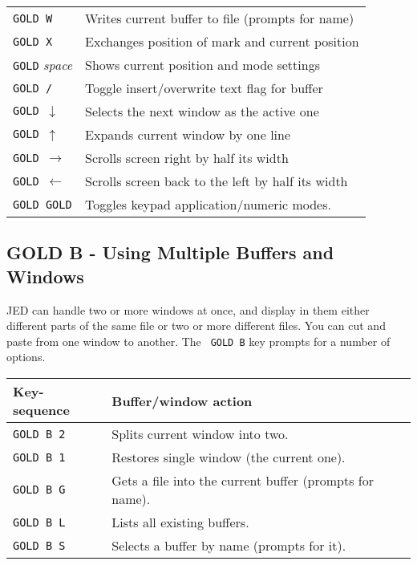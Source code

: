 \documentclass[twoside,11pt]{article}
\newcommand{\xlabel}[1]{}
\begin{document}
\begin{center}
\begin{tabular}{|ll|}
\texttt{GOLD W} & Writes current buffer to file (prompts for name) \\
\texttt{GOLD X} & Exchanges position of mark and current position \\
\texttt{GOLD} \textit{space}   & Shows current position and mode settings \\
\texttt{GOLD /} & Toggle insert/overwrite text flag for buffer \\
\texttt{GOLD $\downarrow$}  & Selects the next window as the active one\\
\texttt{GOLD $\uparrow$  }  & Expands current window by one line \\
\texttt{GOLD $\rightarrow$} & Scrolls screen right by half its width \\
\texttt{GOLD $\leftarrow$ } & Scrolls screen back to the left by half its width \\
\texttt{GOLD GOLD}          & Toggles keypad application/numeric modes.\\
\hline
\end{tabular}
\end{center}


\subsection{\xlabel{gold_b_-_using_multiple_buffers_and_windows}%
GOLD B - Using Multiple Buffers and Windows}
\label{gold_b_-_using_multiple_buffers_and_windows}
\label{buff-ops}

JED can handle two or more windows at once, and display in them either
different parts of the same file or two or more different files.  You
can cut and paste from one window to another. The {\tt
GOLD B} key prompts for a number of options.

\begin{center}
\begin{tabular}{|ll|}
\hline
Key-sequence & Buffer/window action \\
\hline
\texttt{GOLD B 2} & Splits current window into two.\\
\texttt{GOLD B 1} & Restores single window (the current one).\\
\texttt{GOLD B G} & Gets a file into the current buffer (prompts for name).\\
\texttt{GOLD B L} & Lists all existing buffers.\\
\texttt{GOLD B S} & Selects a buffer by name (prompts for it).\\
\hline
\end{tabular}
\end{center}
\end{document}
